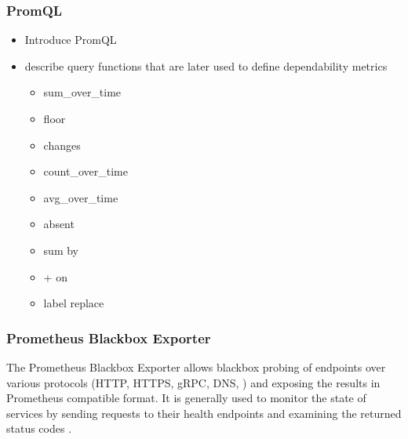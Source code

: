 \subsubsection{PromQL} \label{background-promql}

\begin{itemize}
	\item Introduce PromQL \cite{PrometheusQueryingBasics}
	\item describe query functions that are later used to define dependability metrics \cite{PrometheusQueryingFunctions} \cite{PrometheusQueryingOperators}
	\begin{itemize}
		\item sum\_over\_time
		\item floor
		\item changes
		\item count\_over\_time
		\item avg\_over\_time
		\item absent
		\item sum by
		\item + on
		\item label replace
	\end{itemize}
\end{itemize}

\subsubsection{Prometheus Blackbox Exporter}

The Prometheus Blackbox Exporter allows blackbox probing of endpoints over various protocols (HTTP, HTTPS, gRPC, DNS, \etc) and exposing the results in Prometheus compatible format. It is generally used to monitor the state of services by sending requests to their health endpoints and examining the returned status codes \cite{PrometheusBlackboxExporter}. 


